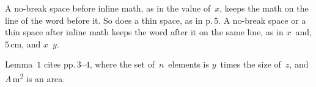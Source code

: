 \documentclass{article}
\begin{document}
A no-break space before inline math, as in the value of~$x$, keeps the
math on the line of the word before it. So does a thin space, as in
p.\,$5$. A no-break space or a thin space after inline math keeps the
word after it on the same line, as in $x$~and, $5$\,cm, and
$x$~$y$.

Lemma~$1$ cites pp.\,$3$--$4$, where the set of~$n$~elements is
$y$~times the size of~$z$, and $A$\,m\textsuperscript{2} is an area.
\end{document}
